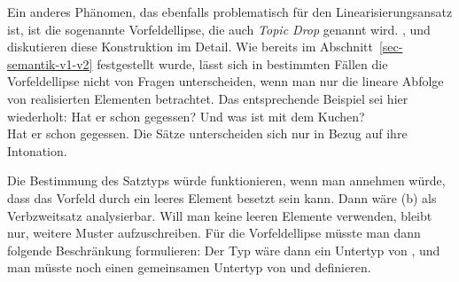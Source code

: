 Ein anderes Phänomen, das ebenfalls problematisch für den Linearisierungsansatz ist,
ist die sogenannte Vorfeldellipse, die auch \emph{Topic Drop} genannt
wird. \citet[Abschnitt~1.5]{Huang84},
\citet{Fries88b} und \citet[574--576, Abschnitt~4.1.1.1]{Hoffmann97a} diskutieren diese Konstruktion im Detail.
Wie bereits im Abschnitt~\ref{sec-semantik-v1-v2} festgestellt wurde, lässt sich in bestimmten
Fällen die Vorfeldellipse nicht von Fragen unterscheiden, wenn man nur die lineare Abfolge
von realisierten Elementen betrachtet. Das entsprechende Beispiel sei hier wiederholt:
\eal
\label{bsp-hat-er-gegessen-zwei}
\ex Hat er schon gegessen?
\ex Und was ist mit dem Kuchen?\\
    Hat er schon gegessen.
\zl
Die Sätze unterscheiden sich nur in Bezug auf ihre Intonation.

Die Bestimmung des Satztyps würde funktionieren, wenn man annehmen würde, dass das Vorfeld
durch ein leeres Element besetzt sein kann. Dann wäre (b) als Verbzweitsatz analysierbar.
Will man keine leeren Elemente verwenden, bleibt nur, weitere Muster aufzuschreiben. Für die Vorfeldellipse
müsste man dann \zb folgende Beschränkung formulieren:
\ea
{} \impl {}
\z
Der Typ  wäre dann ein Untertyp von , und man müsste
noch einen gemeinsamen Untertyp von  und  definieren.

